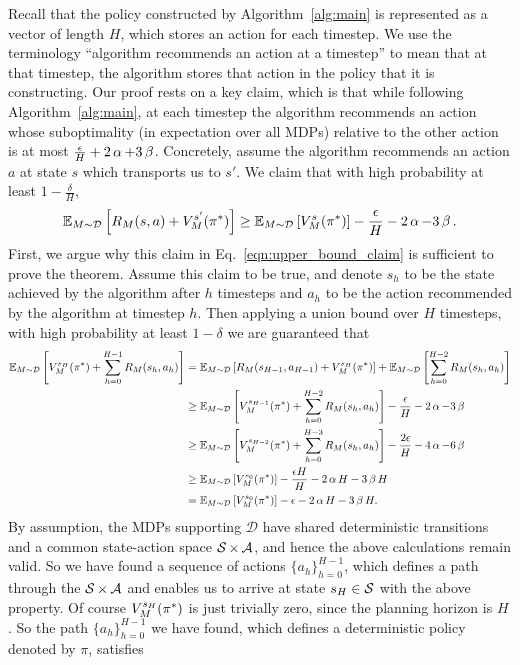 \documentclass[11pt,twoside]{article}
\begin{document}
\noindent Recall that the policy constructed by Algorithm~\ref{alg:main} is represented as a vector of length $H$, which stores an action for each timestep. We use the terminology ``algorithm recommends an action at a timestep'' to mean that at that timestep, the algorithm stores that action in the policy that it is constructing. Our proof rests on a key claim, which is that while following Algorithm~\ref{alg:main}, at each timestep the algorithm recommends an action whose suboptimality (in expectation over all MDPs) relative to the other action is at most $\frac{\epsilon}{H} + 2\operatorname{\alpha} + 3\operatorname{\beta}$. Concretely, assume the algorithm recommends an action $a$ at state $s$ which transports us to $s'$. We claim that with high probability at least $1 - \frac{\delta}{H}$,
\begin{equation}
\label{eqn:upper_bound_claim}
\operatorname{\mathbb{E}}_{M \sim \mathcal{D}} \left[ R_M(s, a) + V^{{s' }}_{{M }}({\pi^*}) \right] \geq \operatorname{\mathbb{E}}_{M \sim \mathcal{D}} \left[ V^{{s }}_{{M }}({\pi^*}) \right] - \frac{\epsilon}{H} - 2 \operatorname{\alpha} - 3 \operatorname{\beta}.
\end{equation}
First, we argue why this claim in Eq.~\eqref{eqn:upper_bound_claim} is sufficient to prove the theorem. Assume this claim to be true, and denote $s_h$ to be the state achieved by the algorithm after $h$ timesteps and $a_h$ to be the action recommended by the algorithm at timestep $h$. Then applying a union bound over $H$ timesteps, with high probability at least $1 - \delta$ we are guaranteed that
\begin{align*}
\operatorname{\mathbb{E}}_{M \sim \mathcal{D}} \left[ V^{{s_{H} }}_{{M }}({\pi^*}) + \sum_{h=0}^{H-1} R_M(s_h, a_h) \right] &= \operatorname{\mathbb{E}}_{M \sim \mathcal{D}} \left[ R_M(s_{H-1}, a_{H-1}) + V^{{s_{H} }}_{{M }}({\pi^*}) \right] + \operatorname{\mathbb{E}}_{M \sim \mathcal{D}} \left[ \sum_{h=0}^{H-2} R_M(s_h, a_h) \right] \\
&\geq \operatorname{\mathbb{E}}_{M \sim \mathcal{D}} \left[ V^{{s_{H-1} }}_{{M }}({\pi^*}) + \sum_{h=0}^{H-2} R_M(s_h, a_h) \right] - \frac{\epsilon}{H} - 2 \operatorname{\alpha} - 3 \operatorname{\beta} \\
&\geq \operatorname{\mathbb{E}}_{M \sim \mathcal{D}} \left[ V^{{s_{H-2} }}_{{M }}({\pi^*}) + \sum_{h=0}^{H-3} R_M(s_h, a_h) \right] - \frac{2\epsilon}{H} - 4\operatorname{\alpha} - 6 \operatorname{\beta} \\
&\geq \operatorname{\mathbb{E}}_{M \sim \mathcal{D}} \left[ V^{{s_0 }}_{{M }}({\pi^*}) \right] - \frac{\epsilon H}{H} - 2\operatorname{\alpha} H - 3 \operatorname{\beta} H \\
&= \operatorname{\mathbb{E}}_{M \sim \mathcal{D}} \left[ V^{{s_0 }}_{{M }}({\pi^*}) \right] - \epsilon - 2\operatorname{\alpha} H - 3 \operatorname{\beta} H.
\end{align*}
By assumption, the MDPs supporting $\mathcal{D}$ have shared deterministic transitions and a common state-action space $\operatorname{\mathcal{S}} \times \operatorname{\mathcal{A}}$, and hence the above calculations remain valid. So we have found a sequence of actions $\{ a_h \}_{h=0}^{H-1}$, which defines a path through the $\operatorname{\mathcal{S}} \times \operatorname{\mathcal{A}}$ and enables us to arrive at state $s_{H} \in \operatorname{\mathcal{S}}$ with the above property. Of course $V^{{s_{H} }}_{{M }}({\pi^*})$ is just trivially zero, since the planning horizon is $H$. So the path $\{ a_h \}_{h=0}^{H-1}$ we have found, which defines a deterministic policy denoted by $\pi$, satisfies
\end{document}
